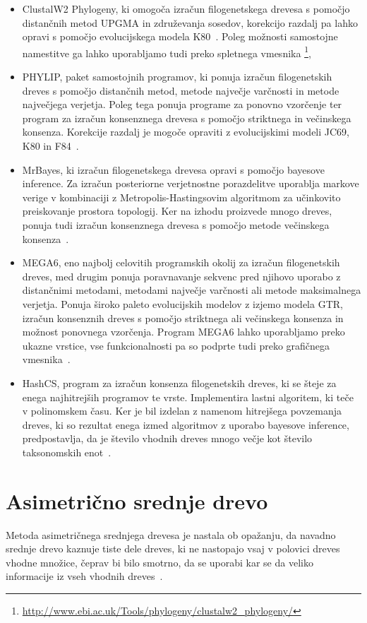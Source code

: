 \documentclass[a4paper, 12pt]{book}
\begin{document}
\begin{itemize}
	\item ClustalW2 Phylogeny, ki omogoča izračun filogenetskega drevesa s pomočjo distančnih metod UPGMA 
	      in združevanja sosedov, korekcijo razdalj pa lahko opravi s pomočjo evolucijskega modela K80~\cite{clustalw2}. 
	      Poleg možnosti samostojne namestitve ga lahko uporabljamo tudi preko spletnega vmesnika
	      \footnote{\url{http://www.ebi.ac.uk/Tools/phylogeny/clustalw2_phylogeny/}}, 
	\item PHYLIP, paket samostojnih programov, ki ponuja izračun filogenetskih dreves s pomočjo distančnih metod, metode
	      največje varčnosti in metode največjega verjetja. Poleg tega ponuja programe za ponovno vzorčenje ter program
	      za izračun konsenznega drevesa s pomočjo striktnega in večinskega konsenza. Korekcije razdalj je mogoče opraviti
	      z evolucijskimi modeli JC69, K80 in F84~\cite{phylip}.
	\item MrBayes, ki izračun filogenetskega drevesa opravi s pomočjo bayesove inference. Za izračun posteriorne verjetnostne
	      porazdelitve uporablja markove verige v kombinaciji z Metropolis-Hastingsovim algoritmom za učinkovito preiskovanje 
	      prostora topologij. Ker na izhodu proizvede mnogo dreves, ponuja tudi izračun konsenznega drevesa s pomočjo metode
	      večinskega konsenza~\cite{mrbayes}.
	\item MEGA6, eno najbolj celovitih programskih okolij za izračun filogenetskih dreves, med drugim ponuja poravnavanje 
	       sekvenc pred njihovo uporabo z distančnimi metodami, metodami največje varčnosti ali metode maksimalnega
	       verjetja. Ponuja široko paleto evolucijskih modelov z izjemo modela GTR, izračun konsenznih dreves s pomočjo
	       striktnega ali večinskega konsenza in možnost ponovnega vzorčenja. Program MEGA6 lahko uporabljamo preko ukazne
	       vrstice, vse funkcionalnosti pa so podprte tudi preko grafičnega vmesnika~\cite{mega6}. 
	\item HashCS, program za izračun konsenza filogenetskih dreves, ki se šteje za enega najhitrejših programov te vrste. 
	      Implementira lastni algoritem, ki teče v polinomskem času. Ker je bil izdelan z namenom hitrejšega povzemanja dreves,
	      ki so rezultat enega izmed algoritmov z uporabo bayesove inference, predpostavlja, da je število vhodnih dreves mnogo večje
	      kot število taksonomskih enot~\cite{hashcs}.
\end{itemize} 

\chapter{Asimetrično srednje drevo}
Metoda asimetričnega srednjega drevesa je nastala ob opažanju, da navadno srednje drevo kaznuje tiste dele dreves, ki ne nastopajo vsaj v polovici dreves vhodne množice, čeprav bi bilo smotrno, da se uporabi kar se da veliko informacije iz vseh vhodnih dreves~\cite{pw}.
\end{document}
